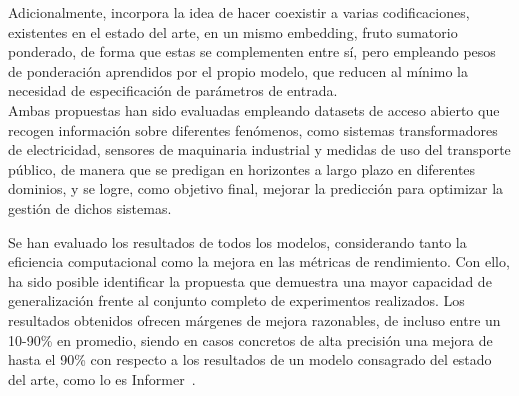 Adicionalmente, incorpora la idea de hacer coexistir a varias codificaciones, existentes en el estado del arte, en un mismo embedding, fruto sumatorio ponderado, de forma que estas se complementen entre sí, pero empleando pesos de ponderación aprendidos por el propio modelo, que reducen al mínimo la necesidad de especificación de parámetros de entrada.\\
Ambas propuestas han sido evaluadas empleando datasets de acceso abierto que recogen información sobre diferentes fenómenos, como sistemas transformadores de electricidad, sensores de maquinaria industrial y medidas de uso del transporte público, de manera que se predigan en horizontes a largo plazo en diferentes dominios, y se logre, como objetivo final, mejorar la predicción para optimizar la gestión de dichos sistemas.\vspace{0.35em}

Se han evaluado los resultados de todos los modelos, considerando tanto la eficiencia computacional como la mejora en las métricas de rendimiento. Con ello, ha sido posible identificar la propuesta que demuestra una mayor capacidad de generalización frente al conjunto completo de experimentos realizados. Los resultados obtenidos ofrecen márgenes de mejora razonables, de incluso entre un 10-90\%  en promedio, siendo en casos concretos de alta precisión una mejora de hasta el 90\% con respecto a los resultados de un modelo consagrado del estado del arte, como lo es Informer~\cite{zhou2021informerefficienttransformerlong}. 

